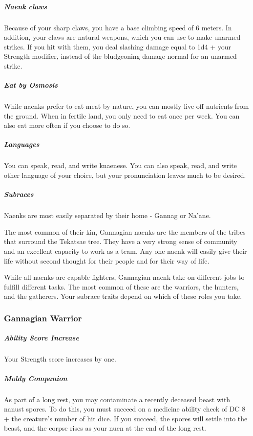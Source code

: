     \subparagraph{Naenk claws} Because of your sharp claws, you have a base climbing speed of 6 meters.
    In addition, your claws are natural weapons, which you can use to make unarmed strikes.
    If you hit with them, you deal slashing damage equal to 1d4 + your Strength modifier, instead of the bludgeoning damage normal for an unarmed strike.

    \subparagraph{Eat by Osmosis} While naenks prefer to eat meat by nature, you can mostly live off nutrients from the ground.
    When in fertile land, you only need to eat once per week.
    You can also eat more often if you choose to do so.

    \subparagraph{Languages} You can speak, read, and write knaenese.
    You can also speak, read, and write other language of your choice, but your pronunciation leaves much to be desired.


    \subparagraph{Subraces} Naenks are most easily separated by their home - Gannag or Na'ane.

    The most common of their kin, Gannagian naenks are the members of the tribes that surround the Tekatsae tree.
    They have a very strong sense of community and an excellent capacity to work as a team.
    Any one naenk will easily give their life without second thought for their people and for their way of life.

    While all naenks are capable fighters, Gannagian naenk take on different jobs to fulfill different tasks.
    The most common of these are the warriors, the hunters, and the gatherers.
    Your subrace traits depend on which of these roles you take.

\subsubsection{Gannagian Warrior}
    \subparagraph{Ability Score Increase} Your Strength score increases by one.

    \subparagraph{Moldy Companion} As part of a long rest, you may contaminate a recently deceased beast with nanust spores.
    To do this, you must succeed on a medicine ability check of DC 8 + the creature's number of hit dice.
    If you succeed, the spores will settle into the beast, and the corpse rises as your nuen at the end of the long rest.

